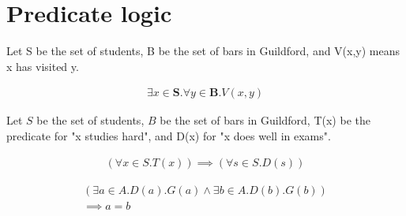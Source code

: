 \documentclass{article}
\begin{document}
\vspace*{1pt}
\section{Predicate logic}

Let S be the set of students, B be the set of bars in Guildford, and V(x,y) means x has visited y.

\begin{align*}  
\exists x \in \mathbf{S}. \forall y \in \mathbf{B}.V(x,y)
\end{align*}

Let ${S}$ be the set of students, ${B}$ be the set of bars in Guildford, T(x) be the predicate for "x studies hard", and D(x) for "x does well in exams".

\begin{align*}
(\forall x \in {S}.T(x)) \implies (\forall s \in {S}.D(s))  
\end{align*}

\begin{align*}
(\exists a \in {A}.D(a).G(a) \land \exists b \in {A}.D(b).G(b)) \\
\implies a = b
\end{align*}
\end{document}
